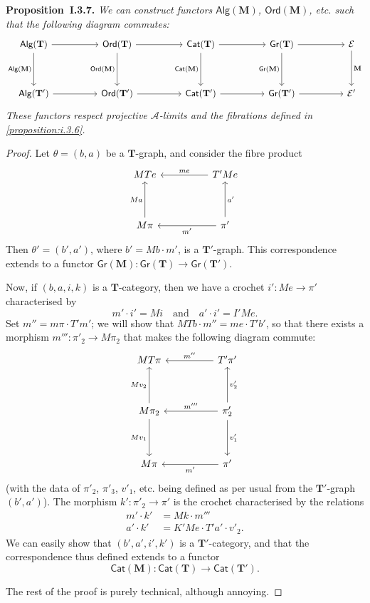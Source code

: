 \documentclass[fleqn]{article}
\newenvironment{itenv}[1]
  {\phantomsection\par\medskip\noindent\textbf{#1.}\itshape}
  {\par\medskip}
\newcommand{\oldpage}[1]{\marginpar{\footnotesize$\Big\vert$ \textit{p.~#1}}}
\newcommand{\TT}{\mathbf{T}}
\newcommand{\MM}{\mathbf{M}}
\newcommand{\textand}{\quad\text{and}\quad}
\newcommand{\cat}[1]{\mathcal{#1}}
\newcommand{\Cat}[1]{\mathsf{#1}}
\newcommand{\Gr}[1]{\Cat{Gr}(#1)}
\newcommand{\Alg}[1]{\Cat{Alg}(#1)}
\newcommand{\Ord}[1]{\Cat{Ord}(#1)}
\begin{document}
\oldpage{237}
\begin{itenv}{Proposition~I.3.7}
  We can construct functors $\Alg{\MM}$, $\Ord{\MM}$, etc. such that the following diagram commutes:
  \[
    \begin{tikzcd}[sep=huge]
      \Alg{\TT}
        \ar[d,swap,"\Alg{\MM}"]
        \ar[r]
    & \Ord{\TT}
        \ar[d,swap,"\Ord{\MM}"]
        \ar[r]
    & \Cat{Cat}(\TT)
        \ar[d,swap,"\Cat{Cat}(\MM)"]
        \ar[r]
    & \Gr{\TT}
        \ar[d,swap,"\Gr{\MM}"]
        \ar[r]
    & \cat{E}
        \ar[d,"\MM"]
    \\\Alg{\TT'}
        \ar[r]
    & \Ord{\TT'}
        \ar[r]
    & \Cat{Cat}(\TT')
        \ar[r]
    & \Gr{\TT'}
        \ar[r]
    & \cat{E'}
    \end{tikzcd}
  \]
  These functors respect projective $\cat{A}$-limits and the fibrations defined in \cref{proposition:i.3.6}.
\end{itenv}

\begin{proof}
  Let $\theta=(b,a)$ be a $\TT$-graph, and consider the fibre product
  \[
    \begin{tikzcd}[sep=huge]
      MTe
    & T'Me
        \ar[l,swap,"me"]
    \\M\pi
        \ar[u,"Ma"]
    & \pi'
        \ar[l,"m'"]
        \ar[u,swap,"a'"]
    \end{tikzcd}
  \]
  Then $\theta'=(b',a')$, where $b'=Mb\cdot m'$, is a $\TT'$-graph.
  This correspondence extends to a functor $\Gr{\MM}\colon\Gr{\TT}\to\Gr{\TT'}$.

  Now, if $(b,a,i,k)$ is a $\TT$-category, then we have a crochet $i'\colon Me\to\pi'$ characterised by
  \[
    m'\cdot i' = Mi
    \textand
    a'\cdot i' = I'Me.
  \]
  Set $m''=m\pi\cdot T'm'$;
  we will show that $MTb\cdot m''=me\cdot T'b'$, so that there exists a morphism $m'''\colon\pi'_2\to M\pi_2$ that makes the following diagram commute:
  \[
    \begin{tikzcd}[sep=huge]
      MT\pi
    & T'\pi'
        \ar[l,swap,"m''"]
    \\M\pi_2
        \ar[u,"Mv_2"]
        \ar[d,swap,"Mv_1"]
    & \pi'_2
        \ar[u,swap,"v'_2"]
        \ar[l,swap,"m'''"]
        \ar[d,"v'_1"]
    \\M\pi
    & \pi'
        \ar[l,"m'"]
    \end{tikzcd}
  \]
  (with the data of $\pi'_2$, $\pi'_3$, $v'_1$, etc. being defined as per usual from the $\TT'$-graph $(b',a')$).
  The morphism $k'\colon\pi'_2\to\pi'$ is the crochet characterised by the relations
  \[
    \begin{aligned}
      m'\cdot k'
    & = Mk\cdot m'''
    \\a'\cdot k'
    & = K'Me\cdot T'a'\cdot v'_2.
    \end{aligned}
  \]
  \oldpage{238}
  We can easily show that $(b',a',i',k')$ is a $\TT'$-category, and that the correspondence thus defined extends to a functor
  \[
    \Cat{Cat}(\MM)\colon \Cat{Cat}(\TT)\to\Cat{Cat}(\TT').
  \]

  The rest of the proof is purely technical, although annoying.
\end{proof}
\end{document}

